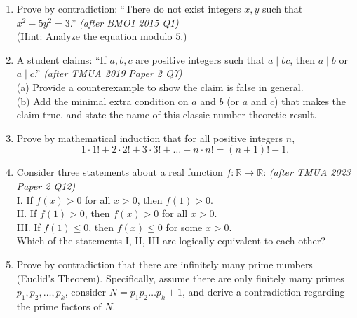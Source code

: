\documentclass[11pt,a4paper]{article}
\begin{document}
\begin{enumerate}

\item Prove by contradiction: ``There do not exist integers $x,y$ such that $x^2 - 5y^2 = 3$.'' \textit{\small(after BMO1 2015 Q1)}\\
(Hint: Analyze the equation modulo $5$.)

\item A student claims: ``If $a,b,c$ are positive integers such that $a \mid bc$, then $a \mid b$ or $a \mid c$.'' \textit{\small(after TMUA 2019 Paper 2 Q7)}\\
(a) Provide a counterexample to show the claim is false in general.\\
(b) Add the minimal extra condition on $a$ and $b$ (or $a$ and $c$) that makes the claim true, and state the name of this classic number-theoretic result.

\item Prove by mathematical induction that for all positive integers $n$,
\[
  1 \cdot 1! + 2 \cdot 2! + 3 \cdot 3! + \dots + n \cdot n! = (n+1)! - 1.
\]

\item Consider three statements about a real function $f: \mathbb{R} \to \mathbb{R}$: \textit{\small(after TMUA 2023 Paper 2 Q12)}\\
I. If $f(x) > 0$ for all $x > 0$, then $f(1) > 0$.\\
II. If $f(1) > 0$, then $f(x) > 0$ for all $x > 0$.\\
III. If $f(1) \le 0$, then $f(x) \le 0$ for some $x > 0$.\\
Which of the statements I, II, III are logically equivalent to each other?

\item Prove by contradiction that there are infinitely many prime numbers (Euclid's Theorem). Specifically, assume there are only finitely many primes $p_1, p_2, \dots, p_k$, consider $N = p_1 p_2 \dots p_k + 1$, and derive a contradiction regarding the prime factors of $N$.

\end{enumerate}

\end{document}
